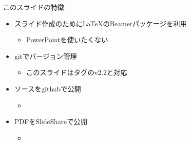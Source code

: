 \begin{frame}{このスライドの特徴}
 \begin{itemize}
  \item スライド作成のために\LaTeX のBeamerパッケージを利用
        \begin{itemize}
         \item PowerPointを使いたくない
        \end{itemize}
  \item gitでバージョン管理
        \begin{itemize}
         \item このスライドはタグのv2.2と対応
        \end{itemize}
  \item ソースをgithubで公開
\begin{itemize}
 \item \href{https://github.com/sakabar/prml_titech_2-3-1_2-3-7}{}
\end{itemize}
  \item PDFをSlideShareで公開
\begin{itemize}
 \item \href{http://www.slideshare.net/takafumisakakibara75/slide-41820194}{}
\end{itemize}

 \end{itemize}
\end{frame}
